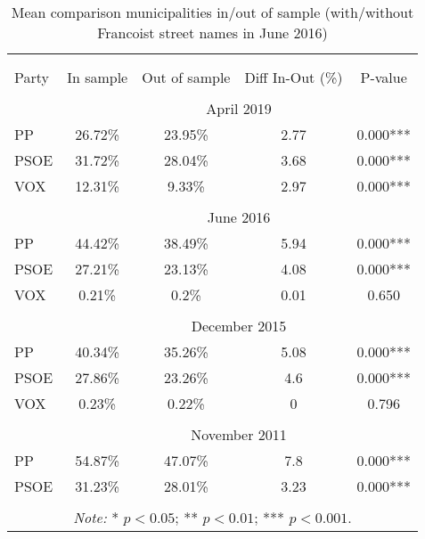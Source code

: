 \begin{table}[!htbp] \centering
\caption{Mean comparison municipalities in/out of sample (with/without Francoist street names in June 2016)}
\label{tab:ttest_sample}
\small
\begin{tabular}{lcccc}
\\[-1.8ex]\hline
\hline \\[-1.8ex]
\\[-1.8ex]
Party & In sample & Out of sample & Diff In-Out (\%) & P-value \\
\hline \\[-1.8ex]
& \multicolumn{4}{c}{April 2019}\\
PP & 26.72\% & 23.95\% & 2.77 & 0.000*** \\
PSOE & 31.72\% & 28.04\% & 3.68 & 0.000*** \\
VOX & 12.31\% & 9.33\% & 2.97 & 0.000*** \\
\hline \\[-1.8ex]
& \multicolumn{4}{c}{June 2016}\\
PP & 44.42\% & 38.49\% & 5.94 & 0.000*** \\
PSOE & 27.21\% & 23.13\% & 4.08 & 0.000*** \\
VOX & 0.21\% & 0.2\% & 0.01 & 0.650 \\
\hline \\[-1.8ex]
& \multicolumn{4}{c}{December 2015}\\
PP & 40.34\% & 35.26\% & 5.08 & 0.000*** \\
PSOE & 27.86\% & 23.26\% & 4.6 & 0.000*** \\
VOX & 0.23\% & 0.22\% & 0 & 0.796 \\
\hline \\[-1.8ex]
& \multicolumn{4}{c}{November 2011}\\
PP & 54.87\% & 47.07\% & 7.8 & 0.000*** \\
PSOE & 31.23\% & 28.01\% & 3.23 & 0.000*** \\
\hline
\hline \\[-1.8ex]
\multicolumn{5}{c}{\parbox[t]{0.65\textwidth}{\textit{Note:} * $p<0.05$; ** $p<0.01$; *** $p<0.001$.}}\\
\end{tabular}
\end{table}
